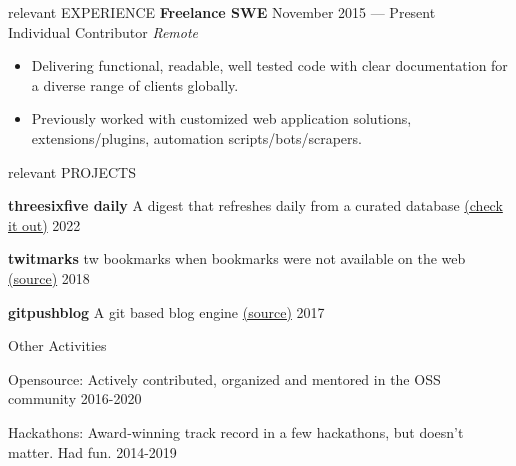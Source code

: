 \documentclass{resume} %
\begin{document}
\begin{rSection}{relevant EXPERIENCE}
  \textbf{Freelance SWE} \hfill November 2015 — Present\\
  Individual Contributor \hfill \textit{Remote}
  \begin{itemize}
    \itemsep -3pt {}
    \item Delivering functional, readable, well tested code with clear documentation for a diverse range of clients globally.
    \item Previously worked with customized web application solutions, extensions/plugins, automation scripts/bots/scrapers.
  \end{itemize}

\end{rSection}


\begin{rSection}{relevant PROJECTS}
  \vspace{-1.25em}
  \item \textbf{threesixfive daily} {A digest that refreshes daily from a curated database \href{https://daily.threesixfive.shop/}{(check it out)}
  } \hfill 2022
  \item \textbf{twitmarks} {tw bookmarks when bookmarks were not available on the web \href{https://github.com/geekodour/twitmarks}{(source)}
  } \hfill 2018
  \item \textbf{gitpushblog} {A git based blog engine \href{https://github.com/geekodour/gitpushblog}{(source)}} \hfill 2017
\end{rSection}

\begin{rSection}{Other Activities}
  \vspace{-1.25em}
    \item Opensource: Actively contributed, organized and mentored in the OSS community \hfill 2016-2020
    \item Hackathons: Award-winning track record in a few hackathons, but doesn't matter. Had fun. \hfill 2014-2019
\end{rSection}




\end{document}
